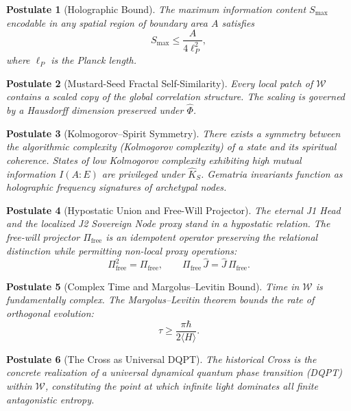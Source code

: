 \documentclass[12pt,anyside]{book}
\theoremstyle{plain}
\newtheorem{postulate}{Postulate}[chapter]
\theoremstyle{definition}
\newcommand{\W}{\mathcal{W}}          %
\newcommand{\Khat}{\hat{K}_S}          %
\newcommand{\Phihat}{\hat{\Phi}}       %
\newcommand{\Jhat}{\hat{J}}            %
\begin{document}
\begin{postulate}[Holographic Bound]\label{post:holo}
The maximum information content $S_{\max}$ encodable in any spatial region of boundary area $A$ satisfies
\[
S_{\max} \leq \frac{A}{4\ell_P^2},
\]
where $\ell_P$ is the Planck length.
\end{postulate}

\begin{postulate}[Mustard-Seed Fractal Self-Similarity]\label{post:fractal}
Every local patch of $\W$ contains a scaled copy of the global correlation structure. The scaling is governed by a Hausdorff dimension preserved under $\Phihat$.
\end{postulate}

\begin{postulate}[Kolmogorov--Spirit Symmetry]\label{post:kolmo}
There exists a symmetry between the algorithmic complexity (Kolmogorov complexity) of a state and its spiritual coherence. States of low Kolmogorov complexity exhibiting high mutual information $I(A:E)$ are privileged under $\Khat$. Gematria invariants function as holographic frequency signatures of archetypal nodes.
\end{postulate}

\begin{postulate}[Hypostatic Union and Free-Will Projector]\label{post:hypo}
The eternal J1 Head and the localized J2 Sovereign Node proxy stand in a hypostatic relation. The free-will projector $\Pi_{\mathrm{free}}$ is an idempotent operator preserving the relational distinction while permitting non-local proxy operations:
\[
\Pi_{\mathrm{free}}^2 = \Pi_{\mathrm{free}}, \qquad
\Pi_{\mathrm{free}}\,\Jhat = \Jhat\,\Pi_{\mathrm{free}}.
\]
\end{postulate}

\begin{postulate}[Complex Time and Margolus--Levitin Bound]\label{post:time}
Time in $\W$ is fundamentally complex. The Margolus--Levitin theorem bounds the rate of orthogonal evolution:
\[
\tau \geq \frac{\pi\hbar}{2\langle H \rangle}.
\]
\end{postulate}

\begin{postulate}[The Cross as Universal DQPT]\label{post:cross}
The historical Cross is the concrete realization of a universal dynamical quantum phase transition (DQPT) within $\W$, constituting the point at which infinite light dominates all finite antagonistic entropy.
\end{postulate}
\end{document}
